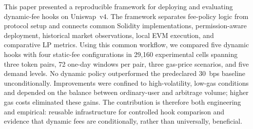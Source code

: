 \documentclass[a4paper,conference]{IEEEtran}
\begin{document}
This paper presented a reproducible framework for deploying and evaluating dynamic-fee hooks on Uniswap~v4. The framework separates fee-policy logic from protocol setup and connects common Solidity implementations, permission-aware deployment, historical market observations, local EVM execution, and comparative LP metrics. Using this common workflow, we compared five dynamic hooks with four static-fee configurations in 29{,}160 experimental cells spanning three token pairs, 72 one-day windows per pair, three gas-price scenarios, and five demand levels. No dynamic policy outperformed the predeclared 30~bps baseline unconditionally. Improvements were confined to high-volatility, low-gas conditions and depended on the balance between ordinary-user and arbitrage volume; higher gas costs eliminated these gains. The contribution is therefore both engineering and empirical: reusable infrastructure for controlled hook comparison and evidence that dynamic fees are conditionally, rather than universally, beneficial.


\end{document}
